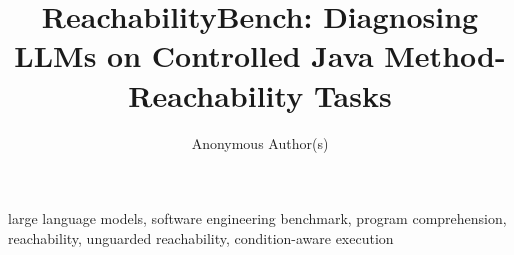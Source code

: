 \documentclass[10pt,conference]{IEEEtran}
\title{ReachabilityBench: Diagnosing LLMs on Controlled Java Method-Reachability Tasks}
\author{Anonymous Author(s)}
\begin{document}
\pagestyle{plain}
\linenumbers
\maketitle

\begin{abstract}
% 
\end{abstract}

\begin{IEEEkeywords}
large language models, software engineering benchmark, program comprehension, reachability, unguarded reachability, condition-aware execution
\end{IEEEkeywords}






% 
% 


% 

% 

\newpage


\end{document}
